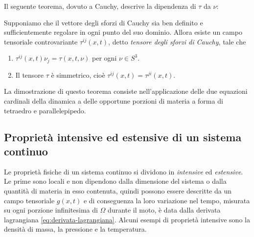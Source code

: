 
\noindent Il seguente teorema, dovuto a Cauchy, descrive la dipendenza
di $\tau$ da $\nu$:
\begin{teor}
Supponiamo che il vettore degli sforzi di Cauchy sia ben definito e
sufficientemente regolare in ogni punto del suo dominio.
Allora esiste un campo tensoriale controvariante $\tau^{ij}(x,t)$,
detto \emph{tensore degli sforzi di Cauchy}, tale che
\begin{enumerate}
\item $\tau^{ij}(x,t) \nu_j = \tau(x,t,\nu)$ per ogni $\nu \in S^3$.
\item Il tensore $\tau$ è simmetrico, cioè $\tau^{ij}(x,t) = \tau^{ji}(x,t)$.
\end{enumerate}
\end{teor}

\noindent La dimostrazione di questo teorema consiste nell'applicazione
delle due equazioni cardinali della dinamica a delle opportune
porzioni di materia a forma di tetraedro e parallelepipedo.

\subsection*{Proprietà intensive ed estensive di un sistema continuo}

Le proprietà fisiche di un sistema continuo si dividono in \emph{intensive}
ed \emph{estensive}. Le prime sono locali e non dipendono dalla dimensione
del sistema o dalla quantità di materia in esso contenuta, quindi
possono essere descritte da un campo tensoriale $g(x,t)$
e di conseguenza la loro variazione nel tempo,
misurata su ogni porzione infinitesima di $\Omega$ durante il moto,
è data dalla derivata lagrangiana \eqref{eq:derivata-lagrangiana}.
Alcuni esempi di proprietà intensive sono la densità di massa,
la pressione e la temperatura.

